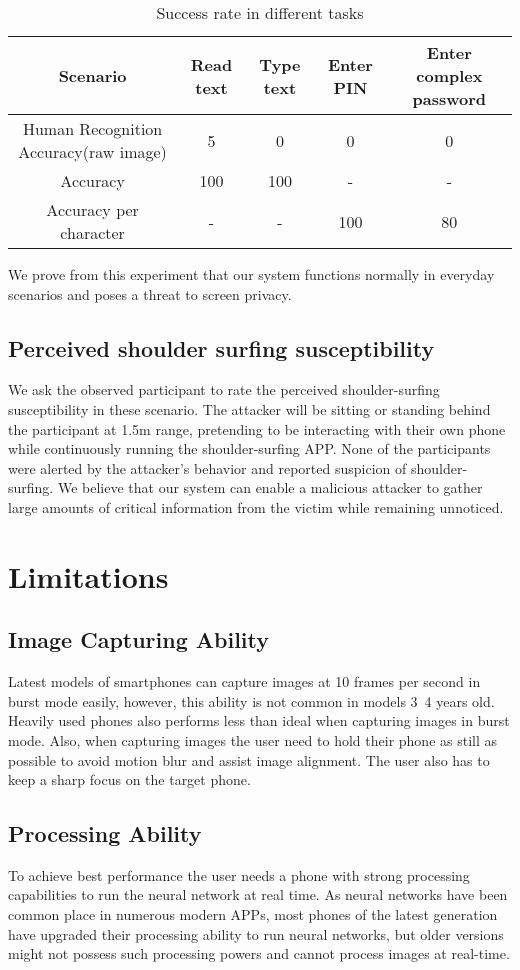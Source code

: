 \begin{table*}  
\begin{tabular}{c|c|c|c|c} 
Scenario & Read text & Type text & Enter PIN & Enter complex password\\ \hline
Human Recognition Accuracy(raw image) & 5 & 0 & 0 & 0\\ \hline
Accuracy & 100 & 100 & - & -\\ \hline
Accuracy per character& - & - & 100 & 80\\ 
\end{tabular}
\caption{Success rate in different tasks}
\label{table-task}
\end{table*}

We prove from this experiment that our system functions normally in everyday scenarios and poses a threat to screen privacy.

\subsection{Perceived shoulder surfing susceptibility}
We ask the observed participant to rate the perceived shoulder-surfing susceptibility in these scenario. The attacker will be sitting or standing behind the participant at 1.5m range, pretending to be interacting with their own phone while continuously running the shoulder-surfing APP. None of the participants were alerted by the attacker's behavior and reported suspicion of shoulder-surfing. We believe that our system can enable a malicious attacker to gather large amounts of critical information from the victim while remaining unnoticed.
\section{Limitations}
\subsection{Image Capturing Ability}
Latest models of smartphones can capture images at 10 frames per second in burst mode easily, however, this ability is not common in models 3~4 years old. Heavily used phones also performs less than ideal when capturing images in burst mode. Also, when capturing images the user need to hold their phone as still as possible to avoid motion blur and assist image alignment. The user also has to keep a sharp focus on the target phone.
\subsection{Processing Ability}
To achieve best performance the user needs a phone with strong processing capabilities to run the neural network at real time. As neural networks have been common place in numerous modern APPs, most phones of the latest generation have upgraded their processing ability to run neural networks, but older versions might not possess such processing powers and cannot process images at real-time.
